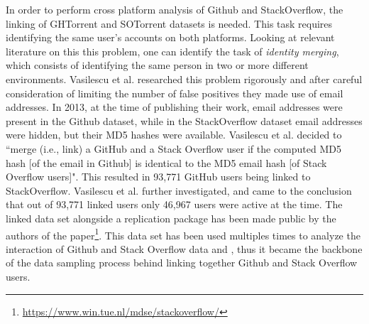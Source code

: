         In order to perform cross platform analysis of Github and StackOverflow, the linking of GHTorrent and SOTorrent datasets is needed. This task requires identifying the same user's accounts on both platforms. Looking at relevant literature on this this problem, one can identify the task of \textit{identity merging}, which consists of identifying the same person in two or more different environments. Vasilescu et al. \cite{vasilescu2013stackoverflow} researched this problem rigorously and after careful consideration of limiting the number of false positives they made use of email addresses. In 2013, at the time of publishing their work, email addresses were present in the Github dataset, while in the StackOverflow dataset email addresses were hidden, but their MD5 hashes were available. Vasilescu et al. \cite{vasilescu2013stackoverflow} decided to ``merge (i.e., link) a GitHub and a Stack Overflow user if the computed MD5 hash [of the email in Github] is identical to the MD5 email hash [of Stack Overflow users]". This resulted in 93,771 GitHub users being linked to StackOverflow. Vasilescu et al. \cite{vasilescu2013stackoverflow} further investigated, and came to the conclusion that out of 93,771 linked users only 46,967 users were active at the time. The linked data set alongside a replication package has been made public by the authors of the paper\footnote{\label{bodgan_dataset}\url{https://www.win.tue.nl/mdse/stackoverflow/}}. This data set has been used multiples times to analyze the interaction of Github and Stack Overflow data \cite{badashian2014involvement} and \cite{lee2017github}, thus it became the backbone of the data sampling process behind linking together Github and Stack Overflow users.  

